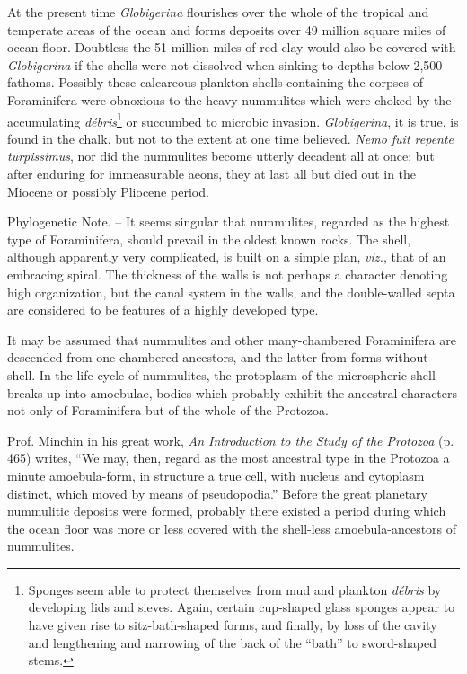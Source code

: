\documentclass[a4paper, 12pt, oneside]{article}
\begin{document}
At the present time \emph{Globigerina} flourishes over the whole of the tropical and temperate areas of the ocean and forms deposits over 49 million square miles of ocean floor. Doubtless the 51 million miles of red clay would also be covered with \emph{Globigerina} if the shells were not dissolved when sinking to depths below 2,500 fathoms. Possibly these calcareous plankton shells containing the corpses of Foraminifera were obnoxious to the heavy nummulites which were choked by the accumulating \emph{débris}\footnote{Sponges seem able to protect themselves from mud and plankton \emph{débris} by developing lids and sieves. Again, certain cup-shaped glass sponges appear to have given rise to sitz-bath-shaped forms, and finally, by loss of the cavity and lengthening and narrowing of the back of the ``bath'' to sword-shaped stems.} or succumbed to microbic invasion. \emph{Globigerina}, it is true, is found in the chalk, but not to the extent at one time believed. \emph{Nemo fuit repente turpissimus}, nor did the nummulites become utterly decadent all at once; but after enduring for immeasurable aeons, they at last all but died out in the Miocene or possibly Pliocene period.

Phylogenetic Note. -- It seems singular that nummulites, regarded as the highest type of Foraminifera, should prevail in the oldest known rocks. The shell, although apparently very complicated, is built on a simple plan, \emph{viz.}, that of an embracing spiral. The thickness of the walls is not perhaps a character denoting high organization, but the canal system in the walls, and the double-walled septa are considered to be features of a highly developed type.

It may be assumed that nummulites and other many-chambered Foraminifera are descended from one-chambered ancestors, and the latter from forms without shell. In the life cycle of nummulites, the protoplasm of the microspheric shell breaks up into amoebulae, bodies which probably exhibit the ancestral characters not only of Foraminifera but of the whole of the Protozoa.

Prof. Minchin in his great work, \emph{An Introduction to the Study of the Protozoa} (p. 465) writes, ``We may, then, regard as the most ancestral type in the Protozoa a minute amoebula-form, in structure a true cell, with nucleus and cytoplasm distinct, which moved by means of pseudopodia.'' Before the great planetary nummulitic deposits were formed, probably there existed a period during which the ocean floor was more or less covered with the shell-less amoebula-ancestors of nummulites.
\end{document}
